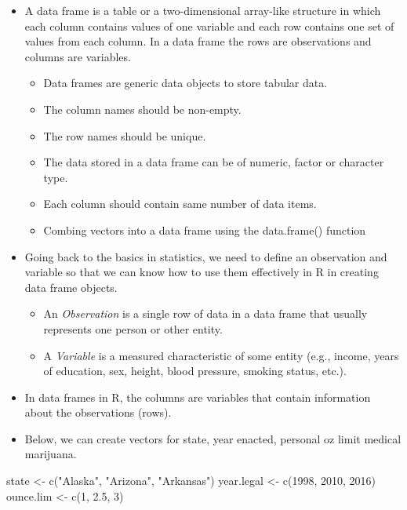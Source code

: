 \documentclass[
  letterpaper,
  DIV=11,
  numbers=noendperiod]{scrreprt}
\newenvironment{Shaded}{\begin{snugshade}}{\end{snugshade}}
\newcommand{\DecValTok}[1]{\textcolor[rgb]{0.68,0.00,0.00}{#1}}
\newcommand{\FloatTok}[1]{\textcolor[rgb]{0.68,0.00,0.00}{#1}}
\newcommand{\FunctionTok}[1]{\textcolor[rgb]{0.28,0.35,0.67}{#1}}
\newcommand{\NormalTok}[1]{\textcolor[rgb]{0.00,0.23,0.31}{#1}}
\newcommand{\OtherTok}[1]{\textcolor[rgb]{0.00,0.23,0.31}{#1}}
\newcommand{\StringTok}[1]{\textcolor[rgb]{0.13,0.47,0.30}{#1}}
\providecommand{\tightlist}{%
  \setlength{\itemsep}{0pt}\setlength{\parskip}{0pt}}\usepackage{longtable,booktabs,array}
\begin{document}
\begin{itemize}
\item
  A data frame is a table or a two-dimensional array-like structure in
  which each column contains values of one variable and each row
  contains one set of values from each column. In a data frame the rows
  are observations and columns are variables.

  \begin{itemize}
  \tightlist
  \item
    Data frames are generic data objects to store tabular data.
  \item
    The column names should be non-empty.
  \item
    The row names should be unique.
  \item
    The data stored in a data frame can be of numeric, factor or
    character type.
  \item
    Each column should contain same number of data items.
  \item
    Combing vectors into a data frame using the data.frame() function
  \end{itemize}
\item
  Going back to the basics in statistics, we need to define an
  observation and variable so that we can know how to use them
  effectively in R in creating data frame objects.

  \begin{itemize}
  \item
    An \emph{Observation} is a single row of data in a data frame that
    usually represents one person or other entity.
  \item
    A \emph{Variable} is a measured characteristic of some entity (e.g.,
    income, years of education, sex, height, blood pressure, smoking
    status, etc.).
  \end{itemize}
\item
  In data frames in R, the columns are variables that contain
  information about the observations (rows).
\item
  Below, we can create vectors for state, year enacted, personal oz
  limit medical marijuana.
\end{itemize}

\begin{Shaded}
\begin{Highlighting}[]
\NormalTok{state }\OtherTok{\textless{}{-}} \FunctionTok{c}\NormalTok{(}\StringTok{"Alaska"}\NormalTok{, }\StringTok{"Arizona"}\NormalTok{, }\StringTok{"Arkansas"}\NormalTok{)}
\NormalTok{year.legal }\OtherTok{\textless{}{-}} \FunctionTok{c}\NormalTok{(}\DecValTok{1998}\NormalTok{, }\DecValTok{2010}\NormalTok{, }\DecValTok{2016}\NormalTok{)}
\NormalTok{ounce.lim }\OtherTok{\textless{}{-}} \FunctionTok{c}\NormalTok{(}\DecValTok{1}\NormalTok{, }\FloatTok{2.5}\NormalTok{, }\DecValTok{3}\NormalTok{)}
\end{Highlighting}
\end{Shaded}
\end{document}
